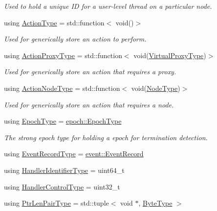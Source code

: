 \begin{DoxyCompactItemize}
\begin{DoxyCompactList}\small\item\em Used to hold a unique ID for a user-\/level thread on a particular node. \end{DoxyCompactList}\item 
using \hyperlink{namespacevt_ae0a5a7b18cc99d7b732cb4d44f46b0f3}{Action\+Type} = std\+::function$<$ void()$>$
\begin{DoxyCompactList}\small\item\em Used for generically store an action to perform. \end{DoxyCompactList}\item 
using \hyperlink{namespacevt_a102aa105d64254d89f7e585d106c95aa}{Action\+Proxy\+Type} = std\+::function$<$ void(\hyperlink{namespacevt_a1b417dd5d684f045bb58a0ede70045ac}{Virtual\+Proxy\+Type})$>$
\begin{DoxyCompactList}\small\item\em Used for generically store an action that requires a proxy. \end{DoxyCompactList}\item 
using \hyperlink{namespacevt_a0436cb2d620dcbb21b5b49cd9c9c4749}{Action\+Node\+Type} = std\+::function$<$ void(\hyperlink{namespacevt_a866da9d0efc19c0a1ce79e9e492f47e2}{Node\+Type})$>$
\begin{DoxyCompactList}\small\item\em Used for generically store an action that requires a node. \end{DoxyCompactList}\item 
using \hyperlink{namespacevt_a81d11b28122d43bf9834577e4a06440f}{Epoch\+Type} = \hyperlink{structvt_1_1epoch_1_1_epoch_type}{epoch\+::\+Epoch\+Type}
\begin{DoxyCompactList}\small\item\em The strong epoch type for holding a epoch for termination detection. \end{DoxyCompactList}\item 
using \hyperlink{namespacevt_a2dc2f149222f88a250ec9a13db36865d}{Event\+Record\+Type} = \hyperlink{structvt_1_1event_1_1_event_record}{event\+::\+Event\+Record}
\item 
using \hyperlink{namespacevt_a59ae068fe828d1c33051ff96f3d016b6}{Handler\+Identifier\+Type} = uint64\+\_\+t
\item 
using \hyperlink{namespacevt_adbbef13b92f0a93b14c219b7cc8a48f2}{Handler\+Control\+Type} = uint32\+\_\+t
\item 
using \hyperlink{namespacevt_a97f320a1d3b9b4035e591671cd7d10f0}{Ptr\+Len\+Pair\+Type} = std\+::tuple$<$ void $\ast$, \hyperlink{namespacevt_aab8d55968084610ce3b17057981e9300}{Byte\+Type} $>$

\end{DoxyCompactItemize}
